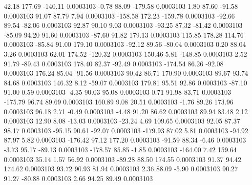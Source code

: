        42.18      177.69     -140.11     0.0003103
       -0.78       88.09     -179.58     0.0003103
        1.80       87.60      -91.58     0.0003103
       91.07       87.79        7.94     0.0003103
     -158.58      172.23     -159.78     0.0003103
      -92.66       89.54      -82.06     0.0003103
       92.87       90.10        9.03     0.0003103
      -93.25       87.32      -81.42     0.0003103
      -85.09       94.20       91.60     0.0003103
      -87.60       91.82      179.13     0.0003103
      115.85      178.28      114.76     0.0003103
      -85.84       91.00      179.10     0.0003103
      -92.12       89.56      -80.04     0.0003103
        0.20       88.04        3.26     0.0003103
       62.01      174.52     -120.32     0.0003103
      150.46        5.81     -148.85     0.0003103
        2.52       91.79      -89.43     0.0003103
      178.40       82.37      -92.49     0.0003103
     -174.54       86.26      -92.08     0.0003103
      176.24       85.04      -91.56     0.0003103
       90.42       86.71      170.90     0.0003103
       89.67       93.74       84.68     0.0003103
      146.32        8.12      -59.07     0.0003103
      179.81       95.51       92.86     0.0003103
      -87.10       91.00        0.59     0.0003103
       -4.35       90.03       95.08     0.0003103
        0.71       91.98       83.71     0.0003103
     -175.79       96.74       89.69     0.0003103
      160.89        9.08       20.51     0.0003103
       -1.76       89.26      173.96     0.0003103
       96.18        2.71       -0.49     0.0003103
       -4.48       91.20       86.62     0.0003103
       89.94       83.48        2.12     0.0003103
       12.90        8.08      -13.03     0.0003103
      -23.24        4.69      109.65     0.0003103
       92.05       87.37       98.17     0.0003103
      -95.15       90.61      -92.07     0.0003103
     -179.93       87.02        5.81     0.0003103
      -94.92       87.97        5.82     0.0003103
     -176.42       97.12      177.20     0.0003103
      -91.59       88.34       -6.46     0.0003103
       -3.73       95.17      -89.13     0.0003103
     -178.57       85.85       -1.85     0.0003103
     -164.00        7.42      159.64     0.0003103
       35.14        1.57       56.92     0.0003103
      -89.28       88.50      174.55     0.0003103
       91.37       94.42      174.62     0.0003103
       93.72       90.93       81.94     0.0003103
        2.36       88.09       -5.90     0.0003103
       90.27       91.27      -80.88     0.0003103
        2.66       94.25       89.49     0.0003103
